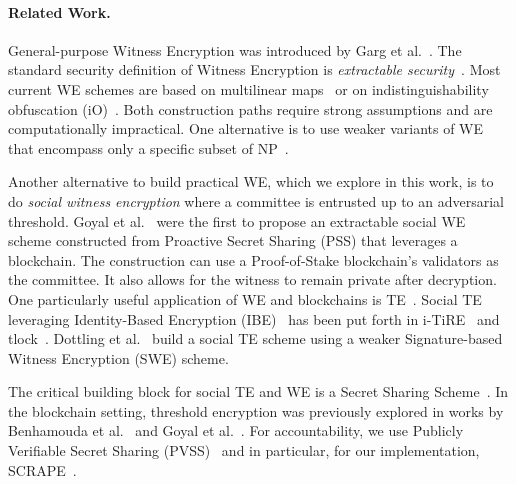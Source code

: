 \paragraph{Related Work.}
General-purpose Witness Encryption was introduced by Garg et al.~\cite{witness_encryption}.
The standard security definition of Witness Encryption is \emph{extractable security}~\cite{turing_machine_fe}.
Most current WE schemes are based on multilinear maps~\cite{witness_encryption,we_multilinear_map} or on indistinguishability obfuscation (iO)~\cite{we_io}. Both construction paths require strong assumptions and are computationally impractical.
One alternative is to use weaker variants of WE that encompass only a specific subset of \textsf{NP}~\cite{MrNISC}.

Another alternative to build practical WE, which we explore in this work, is to do \emph{social witness encryption} where a committee is entrusted up to an adversarial threshold.
Goyal et al.~\cite{eweb} were the first to propose an extractable social WE scheme constructed from Proactive Secret Sharing (PSS) that leverages a blockchain.
The construction can use a Proof-of-Stake blockchain's validators as the committee.
It also allows for the witness to remain private after decryption.
One particularly useful application of WE and blockchains is TE~\cite{timelock_puzzles,timelock_from_crc,timed_release_cryptography}.
Social TE leveraging Identity-Based Encryption (IBE)~\cite{ibe} has been put forth in i-TiRE~\cite{i-TiRE} and tlock~\cite{tlock}.
Dottling et al.~\cite{mcfly} build a social TE scheme using a weaker Signature-based Witness Encryption (SWE) scheme.

The critical building block for social TE and WE is a Secret Sharing Scheme~\cite{shamir_ss}. In the blockchain setting, threshold encryption was previously explored in works by Benhamouda et al.~\cite{benhamouda_ecpss} and Goyal et al.~\cite{eweb}.
For accountability, we use Publicly Verifiable Secret Sharing (PVSS)~\cite{first_pvss_chor,pvss_stadler} and in particular, for our implementation, SCRAPE~\cite{pvss_scrape}.


%

